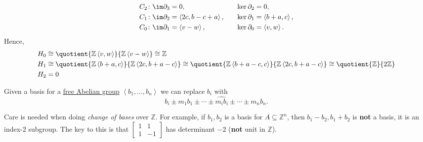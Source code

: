 \begin{explanation}
\[\begin{alignedat}{3}
			C_2&\colon \im \partial _3 = 0, &\ker \partial _2 &= 0, \\
			C_1&\colon \im \partial _2 = \left< 2c, b - c + a \right> , \qquad&\ker \partial _1 &= \left< b +a, c \right>,\\
			C_0&\colon \im \partial _1 = \left< v - w\right> , &\ker \partial _0 &= \left< v, w\right>.
		\end{alignedat}
	\]
	Hence,
	\[
		\begin{split}
			H_0 &\cong \quotient{\mathbb{Z} \left< v, w \right> }{\mathbb{Z} \left< v - w \right> } \cong \mathbb{Z}\\
			H_1 &\cong \quotient{\mathbb{Z} \left< b + a, c \right> }{\mathbb{Z} \left< 2c, b+a-c \right> } \cong \quotient{\mathbb{Z} \left< b + a - c, c \right> }{\mathbb{Z} \left< 2c, b+a-c \right> } \cong \quotient{\mathbb{Z} }{2\mathbb{Z}}\\
			H_2 &= 0\\
		\end{split}
	\]
\end{explanation}

\begin{remark}
	Given a basis for a \hyperref[def:free-Abelian-group]{free Abelian group} \(\left<  b_1, \dots, b_n  \right>\) we can replace \(b_{i} \) with
	\[
		b_i \pm m_1b_1 \pm \cdots \pm \widehat{m_ib_i} \pm \cdots \pm m_n b_n.
	\]
\end{remark}

\begin{remark}
	Care is needed when doing \emph{change of bases} over \(\mathbb{Z} \). For example,
	if \(b_1, b_2\) is a basis for \(A \subseteq \mathbb{Z} ^n\), then \(b_1 - b_2, b_1 + b_2\) is \textbf{not} a basis, it is an index-2 subgroup.
	The key to this is that \(\begin{bmatrix} 1 & 1 \\ 1 & -1 \end{bmatrix}\) has determinant \(-2\) (\textbf{not} unit in \(\mathbb{Z}\)).
\end{remark}


